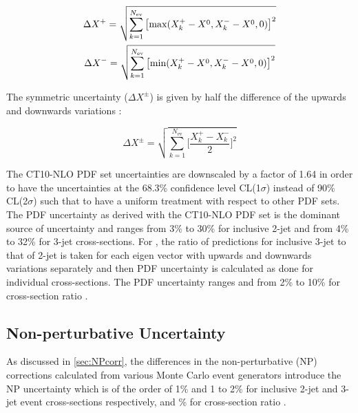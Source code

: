 \begin{equation}
\label{eq:unc_pdf}
\begin{gathered}
\Delta X^+ =  \sqrt{\sum \limits_{k=1}^{N_\mathrm{ev}}\big[{\rm max}(X^{+}_{k}-X^{0},X^{-}_{k}-X^{0},0)\big]^2} \\
\Delta X^- =  \sqrt{\sum \limits_{k=1}^{N_\mathrm{ev}}\big[{\rm min}(X^{+}_{k}-X^{0},X^{-}_{k}-X^{0},0)\big]^2}
\end{gathered}
\end{equation}

The symmetric uncertainty ($\Delta X^{\pm}$) is given by half the difference of the upwards and downwards variations :

\begin{equation}
\label{eq:unc_pdf_symm}
\Delta X^{\pm} = \sqrt{\sum \limits_{k=1}^{N_\mathrm{ev}} \Bigg[\frac{X^{+}_{k}-X^{-}_{k}}{2}\Bigg]^2}
\end{equation}

The CT10-NLO PDF set uncertainties are downscaled by a factor of 1.64 in order to have the uncertainties at the 68.3\% confidence level CL(1$\sigma$) instead of 90\% CL(2$\sigma$) such that to have a uniform treatment with respect to other PDF sets. The PDF uncertainty as derived with the CT10-NLO PDF set is the dominant source of uncertainty and ranges from 3\% to 30\% for inclusive 2-jet and from 4\% to 32\% for 3-jet cross-sections. For \ratio, the ratio of predictions for inclusive 3-jet to that of 2-jet is taken for each eigen vector with upwards and downwards variations separately and then PDF uncertainty is calculated as done for individual cross-sections. The PDF uncertainty ranges and from 2\% to 10\% for cross-section ratio \ratio. 

\subsection{Non-perturbative Uncertainty}
As discussed in \ref{sec:NPcorr}, the differences in the non-perturbative (NP) corrections calculated from various Monte Carlo event generators introduce the NP uncertainty which is of the order of 1\% and 1 to 2\% for inclusive 2-jet and 3-jet event cross-sections respectively, and \% for cross-section ratio \ratio.

